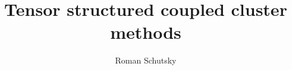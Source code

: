 \documentclass[12pt]{ruthesis}
\title{Tensor structured coupled cluster methods}
\author{Roman Schutsky}
\begin{document}
  \begin{frontmatter}
   \maketitle
   
   
   \tableofcontents
   \listoffigures
   \listoftables
   
  \end{frontmatter}



%






\appendix

%
%
%
%



\end{document}
